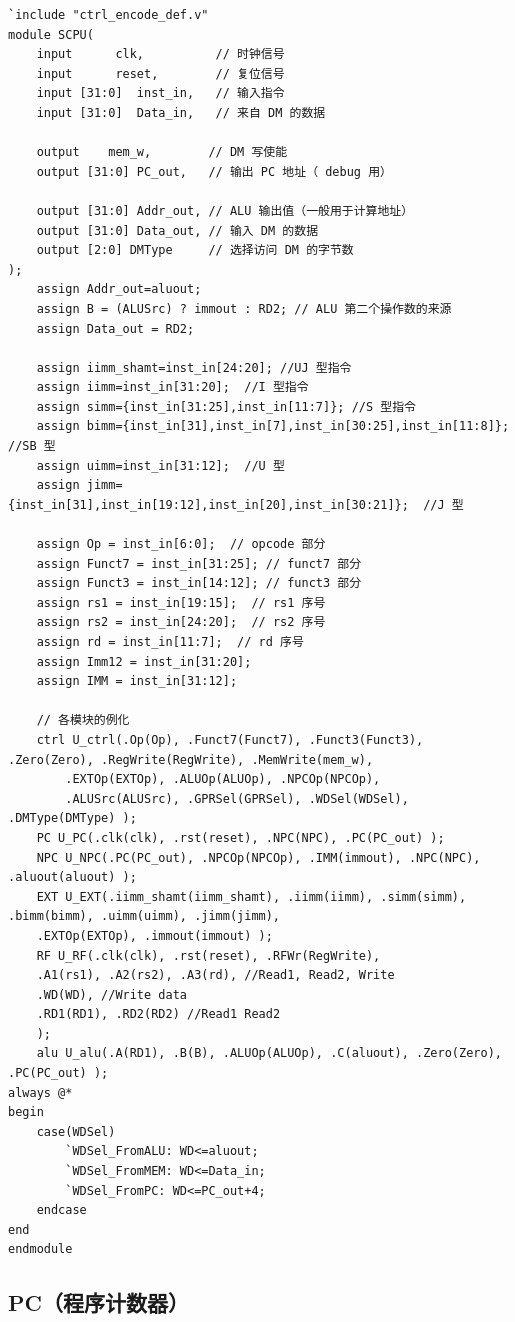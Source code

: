 \documentclass[UTF8,a4paper,autofakebold,15pt]{ctexart}
\begin{document}
{\lstset{language=verilog}
\begin{lstlisting}
`include "ctrl_encode_def.v"
module SCPU(
	input      clk,          // 时钟信号
	input      reset,        // 复位信号
	input [31:0]  inst_in,   // 输入指令
	input [31:0]  Data_in,   // 来自 DM 的数据

	output    mem_w,        // DM 写使能
	output [31:0] PC_out,   // 输出 PC 地址（ debug 用）

	output [31:0] Addr_out, // ALU 输出值（一般用于计算地址）
	output [31:0] Data_out, // 输入 DM 的数据
	output [2:0] DMType     // 选择访问 DM 的字节数
);
	assign Addr_out=aluout;
	assign B = (ALUSrc) ? immout : RD2; // ALU 第二个操作数的来源
	assign Data_out = RD2;
	
	assign iimm_shamt=inst_in[24:20]; //UJ 型指令
	assign iimm=inst_in[31:20];  //I 型指令
	assign simm={inst_in[31:25],inst_in[11:7]}; //S 型指令
	assign bimm={inst_in[31],inst_in[7],inst_in[30:25],inst_in[11:8]};  //SB 型
	assign uimm=inst_in[31:12];  //U 型
	assign jimm={inst_in[31],inst_in[19:12],inst_in[20],inst_in[30:21]};  //J 型
	
	assign Op = inst_in[6:0];  // opcode 部分
	assign Funct7 = inst_in[31:25]; // funct7 部分
	assign Funct3 = inst_in[14:12]; // funct3 部分
	assign rs1 = inst_in[19:15];  // rs1 序号
	assign rs2 = inst_in[24:20];  // rs2 序号
	assign rd = inst_in[11:7];  // rd 序号
	assign Imm12 = inst_in[31:20];
	assign IMM = inst_in[31:12];
	
	// 各模块的例化
	ctrl U_ctrl(.Op(Op), .Funct7(Funct7), .Funct3(Funct3), .Zero(Zero), .RegWrite(RegWrite), .MemWrite(mem_w),
		.EXTOp(EXTOp), .ALUOp(ALUOp), .NPCOp(NPCOp), 
		.ALUSrc(ALUSrc), .GPRSel(GPRSel), .WDSel(WDSel), .DMType(DMType) );
	PC U_PC(.clk(clk), .rst(reset), .NPC(NPC), .PC(PC_out) );
	NPC U_NPC(.PC(PC_out), .NPCOp(NPCOp), .IMM(immout), .NPC(NPC), .aluout(aluout) );
	EXT U_EXT(.iimm_shamt(iimm_shamt), .iimm(iimm), .simm(simm), .bimm(bimm), .uimm(uimm), .jimm(jimm),
	.EXTOp(EXTOp), .immout(immout) );
	RF U_RF(.clk(clk), .rst(reset), .RFWr(RegWrite), 
	.A1(rs1), .A2(rs2), .A3(rd), //Read1, Read2, Write
	.WD(WD), //Write data
	.RD1(RD1), .RD2(RD2) //Read1 Read2
	);
	alu U_alu(.A(RD1), .B(B), .ALUOp(ALUOp), .C(aluout), .Zero(Zero), .PC(PC_out) );
always @*
begin
	case(WDSel)
		`WDSel_FromALU: WD<=aluout;
		`WDSel_FromMEM: WD<=Data_in;
		`WDSel_FromPC: WD<=PC_out+4;
	endcase
end
endmodule
\end{lstlisting}}


\subsection{PC（程序计数器）}
\end{document}
